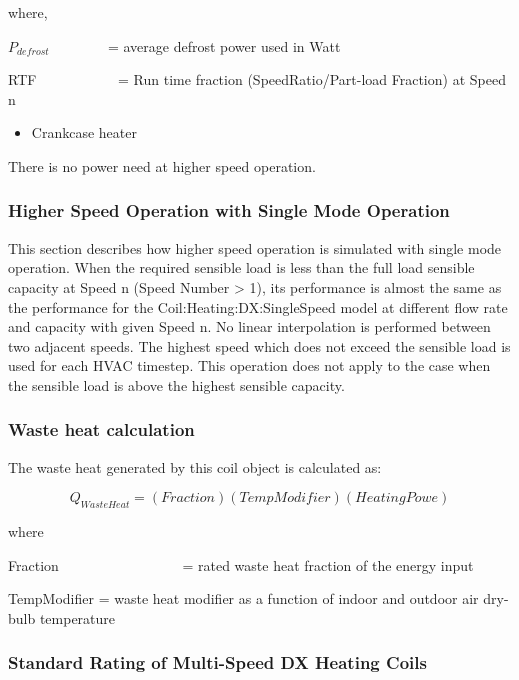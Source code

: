 where,

\({P_{defrost}}\) ~~~~~~~ = average defrost power used in Watt

RTF~~~~~~~~~~~ = Run time fraction (SpeedRatio/Part-load Fraction) at Speed n

\begin{itemize}
  \item Crankcase heater
\end{itemize}

There is no power need at higher speed operation.

\subsubsection{Higher Speed Operation with Single Mode Operation}\label{higher-speed-operation-with-single-mode-operation-1}

This section describes how higher speed operation is simulated with single mode operation. When the required sensible load is less than the full load sensible capacity at Speed n (Speed Number \textgreater{} 1), its performance is almost the same as the performance for the Coil:Heating:DX:SingleSpeed model at different flow rate and capacity with given Speed n. No linear interpolation is performed between two adjacent speeds. The highest speed which does not exceed the sensible load is used for each HVAC timestep. This operation does not apply to the case when the sensible load is above the highest sensible capacity.

\subsubsection{Waste heat calculation}\label{waste-heat-calculation-1-000}

The waste heat generated by this coil object is calculated as:

\begin{equation}
{Q_{WasteHeat}} = (Fraction)(TempModifier)(HeatingPowe)
\end{equation}

where

Fraction~~~~~~~~~~~~~~~~~ = rated waste heat fraction of the energy input

TempModifier = waste heat modifier as a function of indoor and outdoor air dry-bulb temperature

\subsubsection{Standard Rating of Multi-Speed DX Heating Coils}\label{standard-rating-of-multi-speed-dx-heating-coils}

